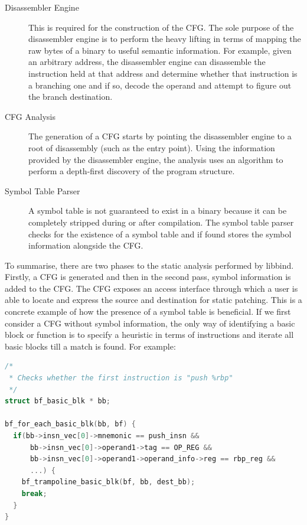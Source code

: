 \begin{description}
\item[Disassembler Engine] This is required for the construction of the CFG. The sole purpose of the disassembler engine is to perform the heavy lifting in terms of mapping the raw bytes of a binary to useful semantic information. For example, given an arbitrary address, the disassembler engine can disassemble the instruction held at that address and determine whether that instruction is a branching one and if so, decode the operand and attempt to figure out the branch destination.
\item[CFG Analysis] The generation of a CFG starts by pointing the disassembler engine to a root of disassembly (such as the entry point). Using the information provided by the disassembler engine, the analysis uses an algorithm to perform a depth-first discovery of the program structure.
\item[Symbol Table Parser] A symbol table is not guaranteed to exist in a binary because it can be completely stripped during or after compilation. The symbol table parser checks for the existence of a symbol table and if found stores the symbol information alongside the CFG.
\end{description}

To summarise, there are two phases to the static analysis performed by libbind. Firstly, a CFG is generated and then in the second pass, symbol information is added to the CFG. The CFG exposes an access interface through which a user is able to locate and express the source and destination for static patching. This is a concrete example of how the presence of a symbol table is beneficial. If we first consider a CFG without symbol information, the only way of identifying a basic block or function is to specify a heuristic in terms of instructions and iterate all basic blocks till a match is found. For example:

\noindent\begin{minipage}{\textwidth}
\begin{lstlisting}[language=C,caption={Identifying basic blocks via instruction heuristics}]
/*
 * Checks whether the first instruction is "push %rbp"
 */
struct bf_basic_blk * bb;

bf_for_each_basic_blk(bb, bf) {
  if(bb->insn_vec[0]->mnemonic == push_insn &&
      bb->insn_vec[0]->operand1->tag == OP_REG &&
      bb->insn_vec[0]->operand1->operand_info->reg == rbp_reg &&
      ...) {
    bf_trampoline_basic_blk(bf, bb, dest_bb);
    break;
  }
}
\end{lstlisting}
\end{minipage}

